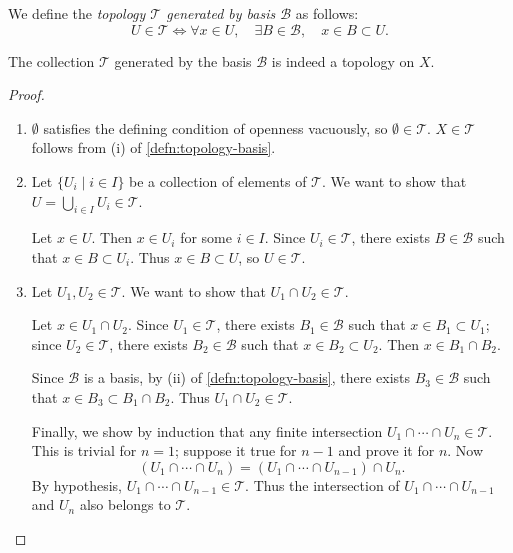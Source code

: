 \begin{definition}
We define the \emph{topology $\mathcal{T}$ generated by basis $\mathcal{B}$} as follows:
\[U\in\mathcal{T}\iff\forall x\in U,\quad\exists B\in\mathcal{B},\quad x\in B\subset U.\]
\end{definition}

\begin{lemma*}
The collection $\mathcal{T}$ generated by the basis $\mathcal{B}$ is indeed a topology on $X$.
\end{lemma*}

\begin{proof} \
\begin{enumerate}[label=(\roman*)]
\item $\emptyset$ satisfies the defining condition of openness vacuously, so $\emptyset\in\mathcal{T}$. $X\in\mathcal{T}$ follows from (i) of \cref{defn:topology-basis}.

\item Let $\{U_i\mid i\in I\}$ be a collection of elements of $\mathcal{T}$. We want to show that $U=\bigcup_{i\in I}U_i\in\mathcal{T}$. 

Let $x\in U$. Then $x\in U_i$ for some $i\in I$. Since $U_i\in\mathcal{T}$, there exists $B\in\mathcal{B}$ such that $x\in B\subset U_i$. Thus $x\in B\subset U$, so $U\in\mathcal{T}$.

\item Let $U_1,U_2\in\mathcal{T}$. We want to show that $U_1\cap U_2\in\mathcal{T}$.

Let $x\in U_1\cap U_2$. Since $U_1\in\mathcal{T}$, there exists $B_1\in\mathcal{B}$ such that $x\in B_1\subset U_1$; since $U_2\in\mathcal{T}$, there exists $B_2\in\mathcal{B}$ such that $x\in B_2\subset U_2$. Then $x\in B_1\cap B_2$.

Since $\mathcal{B}$ is a basis, by (ii) of \cref{defn:topology-basis}, there exists $B_3\in\mathcal{B}$ such that $x\in B_3\subset B_1\cap B_2$. Thus $U_1\cap U_2\in\mathcal{T}$.

Finally, we show by induction that any finite intersection $U_1\cap\cdots\cap U_n\in\mathcal{T}$. This is trivial for $n=1$; suppose it true for $n-1$ and prove it
for $n$. Now
\[(U_1\cap\cdots\cap U_n)=(U_1\cap\cdots\cap U_{n-1})\cap U_n.\]
By hypothesis, $U_1\cap\cdots\cap U_{n-1}\in\mathcal{T}$. Thus the intersection of $U_1\cap\cdots\cap U_{n-1}$ and $U_n$ also belongs to $\mathcal{T}$.
\end{enumerate}
\end{proof}

